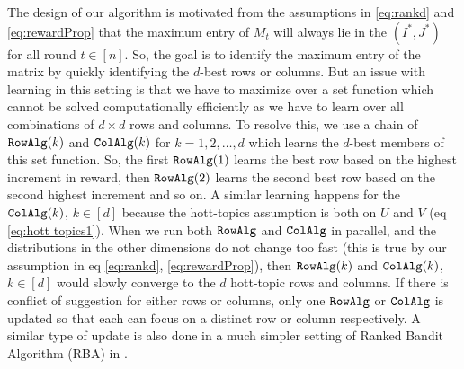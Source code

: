 The design of our algorithm is motivated from the assumptions in \eqref{eq:rankd} and \eqref{eq:rewardProp} that the maximum entry of $M_{t}$ will always lie in the $(I^\ast, J^\ast)$ for all round $t\in [n]$. So, the goal is to identify the maximum entry of the matrix by quickly identifying the $d$-best rows or columns. But an issue with learning in this setting is that we have to maximize over a set function which cannot be solved computationally efficiently as we have to learn over all combinations of $d\times d$ rows and columns. To resolve this, we use a chain of ${\tt RowAlg}(k)$ and ${\tt ColAlg}(k)$ for $k=1,2,\ldots,d$ which learns the $d$-best members of this set function. So, the first ${\tt RowAlg}(1)$ learns the best row based on the highest increment in reward, then ${\tt RowAlg}(2)$ learns the second best row based on the second highest increment and so on. A similar learning happens for the ${\tt ColAlg}(k)$, $k\in [d]$ because the hott-topics assumption is both on $U$ and $V$ (eq \eqref{eq:hott topics1}). When we run both ${\tt RowAlg}$ and ${\tt ColAlg}$ in parallel, and the distributions in the other dimensions do not change too fast (this is true by our assumption in eq \eqref{eq:rankd}, \eqref{eq:rewardProp}), then ${\tt RowAlg}(k)$ and ${\tt ColAlg}(k)$, $k\in [d]$ would slowly converge to the $d$ hott-topic rows and columns.  If there is conflict of suggestion for either rows or columns, only one ${\tt RowAlg}$ or ${\tt ColAlg}$ is updated so that each can focus on a distinct row or column respectively. A similar type of update is also done in a much simpler setting of Ranked Bandit Algorithm (RBA) in \citet{radlinski2008learning}.




